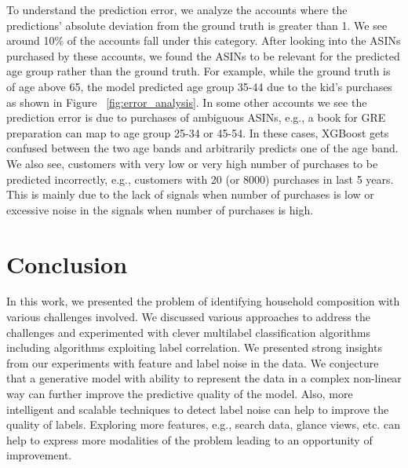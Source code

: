 To understand the prediction error, we analyze the accounts where the predictions' absolute deviation from the ground truth is greater than 1. We see around 10\% of the accounts fall under this category. After looking into the ASINs purchased by these accounts, we found the ASINs to be relevant for the predicted age group rather than the ground truth. For example, while the ground truth is of age above 65, the model predicted age group 35-44 due to the kid's purchases as shown in Figure ~\ref{fig:error_analysis}. In some other accounts we see the prediction error is due to purchases of ambiguous ASINs, e.g., a book for GRE preparation can map to age group 25-34 or 45-54. In these cases, XGBoost gets confused between the two age bands and arbitrarily predicts one of the age band. 
We also see, customers with very low or very high number of purchases to be predicted incorrectly, e.g., customers with 20 (or 8000) purchases in last 5 years. This is mainly due to the lack of signals when number of purchases is low or excessive noise in the signals when number of purchases is high. 
%
\section{Conclusion}
\label{sec:conclusion}
In this work, we presented the problem of identifying household composition with various challenges involved. We discussed various approaches to address the challenges and experimented with clever multilabel classification algorithms including algorithms exploiting label correlation. 
We presented strong insights from our experiments with feature and label noise in the data.
%
We conjecture that a generative model with ability to represent the data in a complex non-linear way can further improve the predictive quality of the model. Also, more intelligent and scalable techniques to detect label noise can help to improve the quality of labels. Exploring more features, e.g., search data, glance views, etc. can help to express more modalities of the problem leading to an opportunity of improvement.


